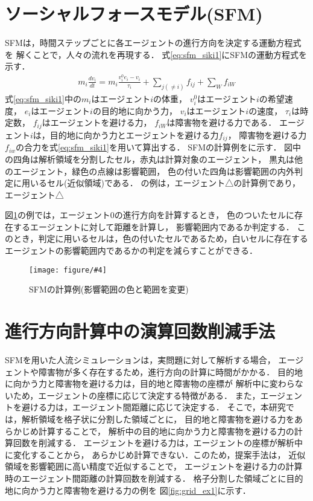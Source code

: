 \documentclass{maelab_y}
\newcommand{\figtb}[5]{ %
\begin{figure}[hbtp]
  \begin{center}
    \texttt{[image: figure/\#4]}
    \caption{#1}
    \label{fig:#5}
  \end{center}
\end{figure}
}%
\newcommand{\分類条件}{%
\begin{table}[t]
\begin{center}
\caption{進行方向を分類する条件}
\ecaption{Classification condition of moving direction $e_{i}$.}
\label{tb:hantei_jouken}
\begin{tabular}{c|c|c|c|c}
\hline \hline
			& 右 & 左 & 上 & 下 \\ \hline
パターン2   & $\frac{1}{\sqrt{2}} < e_x \leq 1  $
		    & $ -1 \leq e_x < \frac{-1}{\sqrt{2}}$ 
		    & $ \frac{-1}{\sqrt{2}} < e_x < \frac{1}{\sqrt{2}} $ 
		    & $ \frac{-1}{2} < e_x < \frac{1}{2} $ \\
パターン3   & $\frac{-1}{2} < e_y < \frac{1}{2} $ 
		    & $\frac{-1}{2} < e_y < \frac{1}{2} $
            & $ \frac{1}{\sqrt{2}} < e_y \leq 1$
		    & $ -1 \leq e_y < \frac{-1}{\sqrt{2}} $ \\
\hline
\multirow{2}{*}{パターン4}   
			& $R_x \geq A_x$ & $R_x < A_x$ & $R_y \geq A_y$ & $R_y < A_y $ \\
	        &  $L_x \geq A_x$ & $L_x < A_x$ & $L_y \geq A_y$ & $L_y < A_y$ \\
\hline
\multirow{2}{*}{パターン5}   
 			& $R_x \geq x_1$ & $R_x < x_2$ & $R_y \geq y_1$ & $R_y < y_2 $ \\
			& $L_x \geq x_1$ & $L_x < x_2$ & $L_y \geq y_1$ & $L_y < y_2 $ \\
\hline
パターン6   & $ \cos(\frac{1}{2}\theta_{view}) \leq  e_y $ 
			& $ e_y \leq -\cos(\frac{1}{2}\theta_{view})$ 
			& $ \sin(\frac{1}{2}(\pi - \theta_{view})) \leq e_x $ 
			& $ e_x \leq \sin(\frac{1}{2}(\pi - \theta_{view}))  $ \\
\hline
\end{tabular}
\end{center}
\end{table}}%
\newcommand{\距離計算new}{%
  \begin{table}[hbtp]
    \begin{center}
    \caption{エージェント間距離の計算回数[$10^{10}$回]}
    \label{tab:my-table}
    \begin{tabular}{c|llllll}
    \hline \hline
    \multirow{2}{*}{人数}   & \multicolumn{6}{c}{パターン}                                                                                                                                                             \\ \cline{2-7} 
                          & \multicolumn{1}{c|}{1}    & \multicolumn{1}{c|}{2}               & \multicolumn{1}{c|}{3}      & \multicolumn{1}{c|}{4}      & \multicolumn{1}{c|}{5}      & \multicolumn{1}{c}{6}    \\ \hline
    \multirow{2}{*}{3000} & \multicolumn{1}{r|}{5.1}  & \multicolumn{1}{r|}{\textbf{3.9}}    & \multicolumn{1}{r|}{4.0}    & \multicolumn{1}{r|}{4.4}    & \multicolumn{1}{r|}{4.1}    & \multicolumn{1}{r}{4.4}  \\
                          & \multicolumn{1}{l|}{}     & \multicolumn{1}{l|}{\textbf{(24\%)}} & \multicolumn{1}{l|}{(23\%)} & \multicolumn{1}{l|}{(15\%)} & \multicolumn{1}{l|}{(21\%)} & (15\%)                   \\ \hline
    \multirow{2}{*}{5000} & \multicolumn{1}{r|}{14.4} & \multicolumn{1}{r|}{\textbf{10.9}}   & \multicolumn{1}{r|}{11.1}   & \multicolumn{1}{r|}{12.2}   & \multicolumn{1}{r|}{11.4}   & \multicolumn{1}{r}{12.2} \\
                          & \multicolumn{1}{l|}{}     & \multicolumn{1}{l|}{\textbf{(24\%)}} & \multicolumn{1}{l|}{(23\%)} & \multicolumn{1}{l|}{(15\%)} & \multicolumn{1}{l|}{(21\%)} & (15\%)                   \\ \hline
    \multirow{2}{*}{7500} & \multicolumn{1}{r|}{33.1} & \multicolumn{1}{r|}{\textbf{25.2}}   & \multicolumn{1}{r|}{25.8}   & \multicolumn{1}{r|}{28.3}   & \multicolumn{1}{r|}{26.7}   & \multicolumn{1}{r}{28.3} \\
                          & \multicolumn{1}{l|}{}     & \multicolumn{1}{l|}{\textbf{(24\%)}} & \multicolumn{1}{l|}{(22\%)} & \multicolumn{1}{l|}{(15\%)} & \multicolumn{1}{l|}{(20\%)} & (15\%)                   \\ \hline
    \end{tabular}
    \end{center}
    \end{table}
}%
\newcommand{\粒子数}{%
\begin{table}[hbtp]
  \begin{center}
    \caption{各配置の詳細}
    \label{tb:haichi_para}
    \begin{tabular}{c|c|c}
      \hline \hline
      & 教室 & 演習室 \\ \hline 
      エージェント数[人] & 96 & 204 \\ \hline
      壁粒子数[個] & 1037 & 1454\\ \hline
      経由地数[個] & 12   & 26 \\ \hline
      解析領域 & $50m\times50m$ & $50m\times50m$ \\ \hline
    \end{tabular}
  \end{center}
\end{table}
}%
\newcommand{\評価環境}{%
\begin{table}[hbtp]
  \begin{center}
    \caption{各配置の詳細}
    \label{tb:haichi_para}
    \begin{tabular}{c|c|c}
      \hline \hline
                 & マシン1                & マシン2 \\ \hline 
      CPU        & Intel Xeon E5-2687W & Intel Xeon E5-2667W \\ \hline
      メモリ     & 64GB                   & 64GB \\ \hline
      OS         & Linux 4.12.9            & Linux 6.5.8 \\ \hline
      コンパイラ & gcc 7.2.0             & gcc 13.2.0 \\ \hline
    \end{tabular}
  \end{center}
\end{table}
}%
\begin{document}
\section{ソーシャルフォースモデル(SFM)}
SFMは，時間ステップごとに各エージェントの進行方向を決定する運動方程式を
解くことで，人々の流れを再現する．
式\eqref{eq:sfm_siki1}にSFMの運動方程式を示す．
%
\begin{align} \label{eq:sfm_siki1}
  m_i \frac{dv_i}{dt} = m_i \frac{v_i^0 e_i - v_i}{\tau_i}
  +\sum_{j(\neq i)}f_{ij}+\sum_{W}f_{iW}
\end{align}
%
式\eqref{eq:sfm_siki1}中の$m_i$はエージェント$i$の体重，
$v_i^0$はエージェント$i$の希望速度，
$e_i$はエージェント$i$の目的地に向かう力，
$v_i$はエージェント$i$の速度，
$\tau_i$は時定数，
$f_{ij}$はエージェントを避ける力，
$f_{iW}$は障害物を避ける力である．
エージェント$i$は，目的地に向かう力とエージェントを避ける力$f_{ij}$，
障害物を避ける力$f_{iw}$の合力を式\eqref{eq:sfm_siki1}を用いて算出する．
SFMの計算例をに示す．
図中の四角は解析領域を分割したセル，赤丸は計算対象のエージェント，
黒丸は他のエージェント，緑色の点線は影響範囲，
色の付いた四角は影響範囲の内外判定に用いるセル(近似領域)である．
の例は，エージェント△の計算例であり，
エージェント△

図\ref{fig:sfm_ex}の例では，エージェント0の進行方向を計算するとき，
色のついたセルに存在するエージェントに対して距離を計算し，
影響範囲内であるか判定する．
このとき，判定に用いるセルは，色の付いたセルであるため，白いセルに存在する
エージェントの影響範囲内であるかの判定を減らすことができる．

\figtb{SFMの計算例(影響範囲の色と範囲を変更)}{}{8}{20231226_sfm_ex.eps}{sfm_ex}

\section{進行方向計算中の演算回数削減手法}
SFMを用いた人流シミュレーションは，実問題に対して解析する場合，
エージェントや障害物が多く存在するため，進行方向の計算に時間がかかる．
目的地に向かう力と障害物を避ける力は，目的地と障害物の座標が
解析中に変わらないため，エージェントの座標に応じて決定する特徴がある．
また，エージェントを避ける力は，エージェント間距離に応じて決定する．
そこで，本研究では，解析領域を格子状に分割した領域ごとに，
目的地と障害物を避ける力をあらかじめ計算することで，
解析中の目的地に向かう力と障害物を避ける力の計算回数を削減する．
エージェントを避ける力は，エージェントの座標が解析中に変化することから，
あらかじめ計算できない．このため，提案手法は，
近似領域を影響範囲に高い精度で近似することで，
エージェントを避ける力の計算時のエージェント間距離の計算回数を削減する．
格子分割した領域ごとに目的地に向かう力と障害物を避ける力の例を
図\ref{fig:grid_ex1}に示す．
\end{document}
